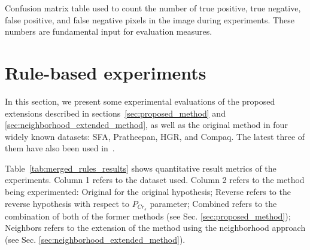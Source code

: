 \begin{table}[H]
    \centering


    \caption[Confusion matrix table used during experiments]{Confusion matrix table used to count the number of true positive, true negative, false positive, and false negative pixels in the image during experiments. These numbers are fundamental input for evaluation measures.}
    \label{tab:confusion_matrix}
\end{table}



\section{Rule-based experiments}
\label{sec:rule_based_experiments}
In this section, we present some experimental evaluations of the proposed extensions described in sections~\ref{sec:proposed_method} and \ref{sec:neighborhood_extended_method}, as well as the original method in four widely known datasets: SFA, Pratheepan, HGR, and Compaq. The latest three of them have also been used in~\citet{brancati:17}.

Table~\ref{tab:merged_rules_results} shows quantitative result metrics of the experiments. Column 1 refers to the dataset used. Column 2 refers to the method being experimented: Original for the original hypothesis;  Reverse refers to the reverse hypothesis with respect to $P_{Cr_{s}}$ parameter; Combined refers to the combination of both of the former methods (see  Sec. \ref{sec:proposed_method}); Neighbors refers to the extension of the method using the neighborhood approach (see  Sec. \ref{sec:neighborhood_extended_method}).


